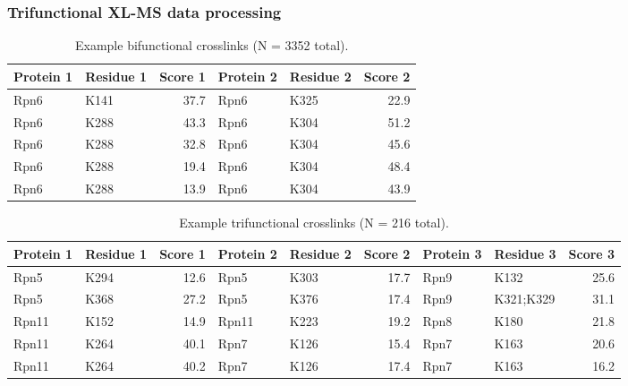 \documentclass[a4paper,8pt]{beamer}
\begin{document}
\begin{frame}
    \frametitle{Trifunctional XL-MS data processing}
\begin{table}[h]
\centering
\small
\begin{tabular}{llrllr}
\toprule
Protein 1 & Residue 1 & Score 1 & Protein 2 & Residue 2 & Score 2 \\
\midrule
Rpn6  & K141 & 37.7 & Rpn6  & K325 & 22.9 \\
Rpn6  & K288 & 43.3 & Rpn6  & K304 & 51.2 \\
Rpn6  & K288 & 32.8 & Rpn6  & K304 & 45.6 \\
Rpn6  & K288 & 19.4 & Rpn6  & K304 & 48.4 \\
Rpn6  & K288 & 13.9 & Rpn6  & K304 & 43.9 \\
\bottomrule
\end{tabular}
\caption{Example bifunctional crosslinks (N = 3352 total).}
\end{table}
    \begin{table}[h]
\centering
\small
\begin{tabular}{llrllrllr}
\toprule
Protein 1 & Residue 1 & Score 1 & Protein 2 & Residue 2 & Score 2 & Protein 3 & Residue 3 & Score 3 \\
\midrule
Rpn5  & K294 & 12.6 & Rpn5  & K303 & 17.7 & Rpn9  & K132       & 25.6 \\
Rpn5  & K368 & 27.2 & Rpn5  & K376 & 17.4 & Rpn9  & K321;K329  & 31.1 \\
Rpn11 & K152 & 14.9 & Rpn11 & K223 & 19.2 & Rpn8  & K180       & 21.8 \\
Rpn11 & K264 & 40.1 & Rpn7  & K126 & 15.4 & Rpn7  & K163       & 20.6 \\
Rpn11 & K264 & 40.2 & Rpn7  & K126 & 17.4 & Rpn7  & K163       & 16.2 \\
\bottomrule
\end{tabular}
\caption{Example trifunctional crosslinks (N = 216 total).}
\end{table}
\end{frame}
\end{document}

